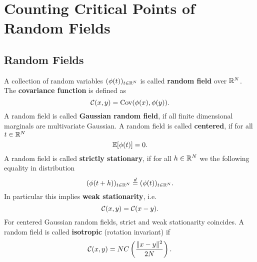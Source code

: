 \section{Counting Critical Points of Random Fields}

\subsection{Random Fields}

\begin{definition}
	A collection of random variables \((\phi(t))_{t\in\mathbb{R}^N}\) is called
	\textbf{random field} over \(\mathbb{R}^N\). The \textbf{covariance function}
	is defined as
	\begin{equation*}
		\mathcal{C}(x,y) = \operatorname{Cov}(\phi(x), \phi(y)).
	\end{equation*}
	A random field is called \textbf{Gaussian random field}, if all finite
	dimensional marginals are multivariate Gaussian.
	A random field is called \textbf{centered}, if for all \(t\in\mathbb{R}^N\)
	\[
		\mathbb{E}[\phi(t)] = 0.
	\]
	A random field is called \textbf{strictly stationary}, if for all
	\(h\in\mathbb{R}^N\) we the following equality in distribution
	\[
		(\phi(t+h))_{t\in\mathbb{R}^N} \overset{d}= (\phi(t))_{t\in\mathbb{R}^N}.
	\]
	In particular this implies	\textbf{weak stationarity}, i.e.
	\begin{equation*}
		\mathcal{C}(x,y) = \mathcal{C}(x-y).
	\end{equation*}
	For centered Gaussian random fields, strict and weak stationarity coincides.
	A random field is called \textbf{isotropic} (rotation invariant) if	
	\begin{equation*}
		\mathcal{C}(x,y) = N C\left(\frac{\|x-y\|^2}{2N}\right).
	\end{equation*}
\end{definition}

